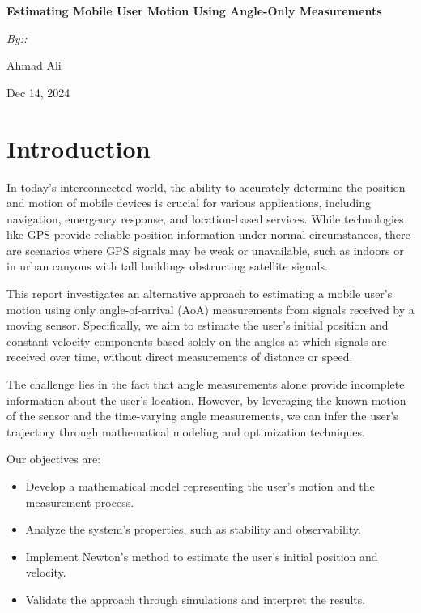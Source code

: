 \documentclass[12pt]{article}
\begin{document}
\begin{titlepage}
    \centering
    \vspace*{2cm}
    {\Large\bfseries Estimating Mobile User Motion Using Angle-Only Measurements\par}
    \vspace{1.5cm}
    \vspace{2cm}
    {\itshape By::\par}
    {\large Ahmad Ali\par}
    \vfill
    {\large Dec 14, 2024 \par}
\end{titlepage}

\tableofcontents
\newpage

\section{Introduction}

In today's interconnected world, the ability to accurately determine the position and motion of mobile devices is crucial for various applications, including navigation, emergency response, and location-based services. While technologies like GPS provide reliable position information under normal circumstances, there are scenarios where GPS signals may be weak or unavailable, such as indoors or in urban canyons with tall buildings obstructing satellite signals.

This report investigates an alternative approach to estimating a mobile user's motion using only angle-of-arrival (AoA) measurements from signals received by a moving sensor. Specifically, we aim to estimate the user's initial position and constant velocity components based solely on the angles at which signals are received over time, without direct measurements of distance or speed.

The challenge lies in the fact that angle measurements alone provide incomplete information about the user's location. However, by leveraging the known motion of the sensor and the time-varying angle measurements, we can infer the user's trajectory through mathematical modeling and optimization techniques.

Our objectives are:

\begin{itemize}
    \item Develop a mathematical model representing the user's motion and the measurement process.
    \item Analyze the system's properties, such as stability and observability.
    \item Implement Newton's method to estimate the user's initial position and velocity.
    \item Validate the approach through simulations and interpret the results.
\end{itemize}
\end{document}
